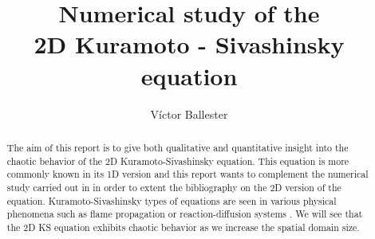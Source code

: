\documentclass[twoside]{article}
\title{Numerical study of the\\2D Kuramoto - Sivashinsky equation}
\author{Víctor Ballester}
\date{\parbox{\linewidth}{\centering
Instabilities and Nonlinear Phenomena\endgraf
M2 - Applied and Theoretical Mathematics\endgraf
Université Paris-Dauphine, PSL\endgraf
\today}}
\begin{document}
\maketitle
\begin{abstract}
  The aim of this report is to give both qualitative and quantitative insight into the chaotic behavior of the 2D Kuramoto-Sivashinsky equation. This equation is more commonly known in its 1D version and this report wants to complement the numerical study carried out in \cite{Kalogirou2015} in order to extent the bibliography on the 2D version of the equation. Kuramoto-Sivashinsky types of equations are seen in various physical phenomena such as flame propagation or reaction-diffusion systems \cite{Kuramoto,Sivashinsky1977}. We will see that the 2D KS equation exhibits chaotic behavior as we increase the spatial domain size.
\end{abstract}
\end{document}
